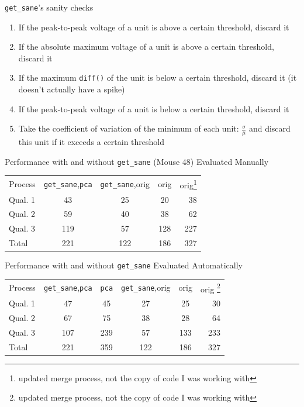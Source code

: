 \documentclass[11pt,handout]{beamer}
\begin{document}
    \begin{frame}{\texttt{get\_sane}'s sanity checks}
        \begin{enumerate}
            \pause
            \item If the peak-to-peak voltage of a unit is above a certain
threshold, discard it
            \pause
            \item If the absolute maximum voltage of a unit is above a certain
threshold, discard it 
            \pause
            \item If the maximum \texttt{diff()} of the unit is below a certain
threshold, discard it (it doesn't actually have a spike)
            \pause
            \item If the peak-to-peak voltage of a unit is below a certain
threshold, discard it
            \pause
            \item Take the coefficient of variation of the minimum of each unit:
\ensuremath{\frac{\sigma}{\mu}} and discard this unit if it exceeds a certain threshold
         \end{enumerate}
    \end{frame}

    \begin{frame}{Performance with and without \texttt{get\_sane} (Mouse 48)
Evaluated Manually}
        \begin{tabular}{l c c c r}
        \pause
        Process&\texttt{get\_sane},\texttt{pca}&\texttt{get\_sane},orig&orig&orig\footnote{updated
merge process, not the copy of code I was working with}\\
        \pause
        Qual. 1&43&25&20&38\\
        Qual. 2&59&40&38&62\\
        Qual. 3&119&57&128&227\\
        Total&221&122&186&327
        \end{tabular}
    \end{frame}

    \begin{frame}{Performance with and without \texttt{get\_sane}
Evaluated Automatically}
        \begin{tabular}{l c c c c r}
        \pause
        Process&\texttt{get\_sane},\texttt{pca}&\texttt{pca}&\texttt{get\_sane},orig&orig&orig
\footnote{updated
merge process, not the copy of code I was working with}\\
        \pause
        Qual. 1&47&45&27&25&30\\
        Qual. 2&67&75&38&28&64\\
        Qual. 3&107&239&57&133&233\\
        Total&221&359&122&186&327\\
        \end{tabular}
    \end{frame} 
\end{document}
